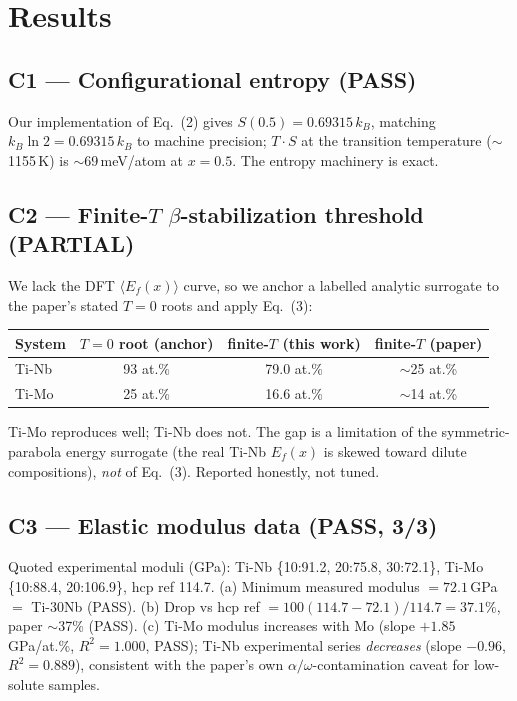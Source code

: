 \documentclass[11pt]{article}
\begin{document}
\section{Results}

\subsection*{C1 --- Configurational entropy (PASS)}
Our implementation of Eq.~(2) gives $S(0.5)=0.69315\,k_B$, matching $k_B\ln 2=0.69315\,k_B$ to
machine precision; $T\!\cdot\!S$ at the transition temperature ($\sim$1155\,K) is $\sim$69\,meV/atom
at $x=0.5$. The entropy machinery is exact.

\subsection*{C2 --- Finite-$T$ $\beta$-stabilization threshold (PARTIAL)}
We lack the DFT $\langle E_f(x)\rangle$ curve, so we anchor a labelled analytic surrogate to the
paper's stated $T=0$ roots and apply Eq.~(3):
\begin{center}
\begin{tabular}{lccc}
\toprule
System & $T=0$ root (anchor) & finite-$T$ (this work) & finite-$T$ (paper) \\
\midrule
Ti-Nb & 93 at.\% & 79.0 at.\% & $\sim$25 at.\% \\
Ti-Mo & 25 at.\% & 16.6 at.\% & $\sim$14 at.\% \\
\bottomrule
\end{tabular}
\end{center}
Ti-Mo reproduces well; Ti-Nb does not. The gap is a limitation of the symmetric-parabola energy
surrogate (the real Ti-Nb $E_f(x)$ is skewed toward dilute compositions), \emph{not} of Eq.~(3).
Reported honestly, not tuned.

\subsection*{C3 --- Elastic modulus data (PASS, 3/3)}
Quoted experimental moduli (GPa): Ti-Nb \{10:91.2, 20:75.8, 30:72.1\}, Ti-Mo \{10:88.4, 20:106.9\},
hcp ref 114.7.
(a) Minimum measured modulus $=72.1$\,GPa $=$ Ti-30Nb (PASS).
(b) Drop vs hcp ref $=100(114.7-72.1)/114.7=37.1\%$, paper $\sim$37\% (PASS).
(c) Ti-Mo modulus increases with Mo (slope $+1.85$\,GPa/at.\%, $R^2=1.000$, PASS); Ti-Nb
experimental series \emph{decreases} (slope $-0.96$, $R^2=0.889$), consistent with the paper's own
$\alpha/\omega$-contamination caveat for low-solute samples.
\end{document}

